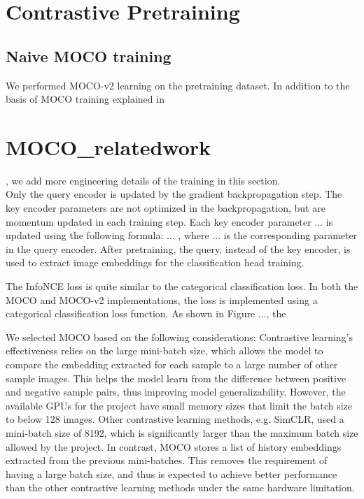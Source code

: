 \documentclass[12pt,twoside]{report}
\begin{document}
\section{Contrastive Pretraining}
\subsection{Naive MOCO training} \label{sec:naiveMOCO}
We performed MOCO-v2 \cite{mocov2} learning on the pretraining dataset. In addition to the basis of MOCO training explained in \section{MOCO_relatedwork}, we add more engineering details of the training in this section. \\

Only the query encoder is updated by the gradient backpropagation step. The key encoder parameters are not optimized in the backpropagation, but are momentum updated in each training step. Each key encoder parameter ... is updated using the following formula: ... , where ... is the corresponding parameter in the query encoder. After pretraining, the query, instead of the key encoder, is used to extract image embeddings for the classification head training. 

The InfoNCE loss is quite similar to the categorical classification loss. In both the MOCO and MOCO-v2 implementations, the loss is implemented using a categorical classification loss function. As shown in Figure ..., the 

We selected MOCO based on the following considerations: Contrastive learning's effectiveness relies on the large mini-batch size, which allows the model to compare the embedding extracted for each sample to a large number of other sample images. This helps the model learn from the difference between positive and negative sample pairs, thus improving model generalizability. However, the available GPUs for the project have small memory sizes that limit the batch size to below 128 images. Other contrastive learning methods, e.g. SimCLR, used a mini-batch size of 8192, which is significantly larger than the maximum batch size allowed by the project. In contrast, MOCO stores a list of history embeddings extracted from the previous mini-batches. This removes the requirement of having a large batch size, and thus is expected to achieve better performance than the other contrastive learning methods under the same hardware limitation.\\
\end{document}
